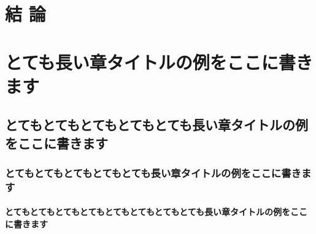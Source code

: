 \chapter{結 論}

\chapter{とても長い章タイトルの例をここに書きます}
\section{とてもとてもとてもとてもとても長い章タイトルの例をここに書きます}
\subsection{とてもとてもとてもとてもとても長い章タイトルの例をここに書きます}
\subsubsection{とてもとてもとてもとてもとてもとてもとてもとても長い章タイトルの例をここに書きます}